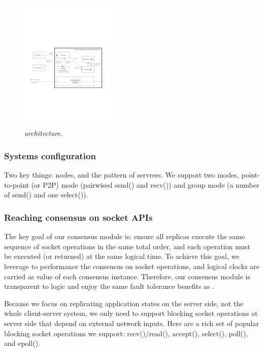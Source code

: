\begin{figure}[t]
\centering
\includegraphics[width=0.4\textwidth]{figures/architecture}
\vspace{-.05in}
\caption{{\em \msmr architecture.}} \label{fig:arch}
\vspace{-.05in}
\end{figure}


\subsubsection{Systems configuration} \label{sec:rep-config}

Two key things: nodes, and the pattern of servrers. We support two modes, 
point-to-point (or P2P) mode (pairwised send() and recv()) and group mode (a number of send() 
and one select()).

\subsubsection{Reaching consensus on socket APIs} \label{sec:rep-consensus}
The key goal of our consensus module is: ensure all replicas execute the same 
sequence of socket operations in the same total order, and each operation must 
be executed (or returned) at the same logical time. To achieve this goal, we 
leverage \paxos to performance the consensus on socket operations, and 
logical clocks are carried as value of each consensus instance. Therefore, our 
consensus module is transparent to \paxos logic and enjoy the same fault tolerance 
benefits as \paxos.

Because we focus on replicating application states on the server side, not the 
whole client-server system, we only need to support blocking socket operations at server side
that depend on external network inputs. Here are a rich set of popular 
blocking socket operations we support: recv()/read(), accept(), select(), poll(), and 
epoll().

